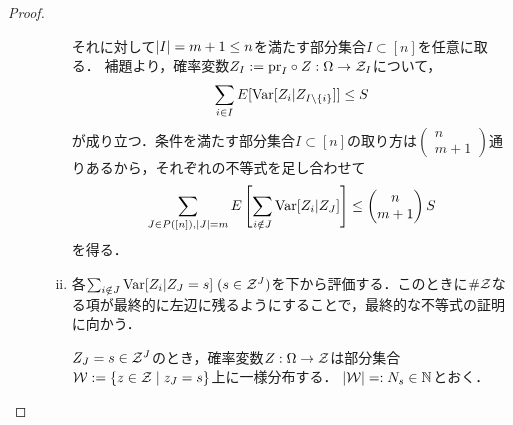 \documentclass[uplatex,dvipdfmx]{jsreport}
\begin{document}
\begin{proof}
\begin{description}
\begin{enumerate}[(i)]
            それに対して$\lvert I\rvert=m+1\le n$を満たす部分集合$I\subset[n]$を任意に取る．
            補題より，確率変数$Z_I:=\mathrm{pr}_I\circ Z:\Omega\to\mathcal{Z}_I$について，
            \[\sum_{i\in I}E[\mathrm{Var}[Z_i|Z_{I\setminus\left\{i\right\}}]]\le S\]
            が成り立つ．条件を満たす部分集合$I\subset[n]$の取り方は$\begin{pmatrix}n\\m+1\end{pmatrix}$通りあるから，それぞれの不等式を足し合わせて
            \[\sum_{J\in P([n]),\lvert J\rvert=m}E\left[\sum_{i\notin J}\mathrm{Var}[Z_i|Z_J]\right]\le \begin{pmatrix}n\\m+1\end{pmatrix}S\]
            を得る．
            \item 各$\sum_{i\notin J}\mathrm{Var}[Z_i|Z_J=s]\;(s\in\mathcal{Z}^J)$を下から評価する．このときに$\#\mathcal{Z}$なる項が最終的に左辺に残るようにすることで，最終的な不等式の証明に向かう．
            
            $Z_J=s\in\mathcal{Z}^J$のとき，確率変数$Z:\Omega\to\mathcal{Z}$は部分集合$\mathcal{W}:=\left\{z\in\mathcal{Z}\mid z_J=s\right\}$上に一様分布する．
            $\lvert\mathcal{W}\rvert=:N_s\in\mathbb{N}$とおく．
            

\end{enumerate}
\end{description}
\end{proof}
\end{document}
